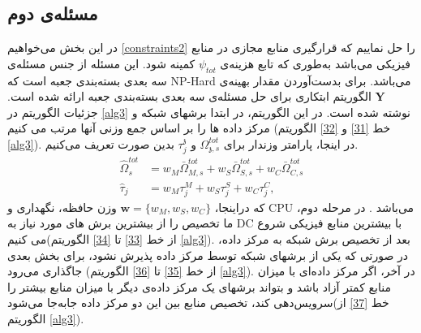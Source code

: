 \subsection{مسئله‌ی دوم}
در این بخش می‌خواهیم \eqref{constraints2} را حل نماییم که قرارگیری منابع مجازی در منابع فیزیکی می‌باشد به‌طوری که تابع هزینه‌ی  $\psi_{tot}$ کمینه شود. این مسئله از جنس مسئله‌ی سه بعدی بسته‌بندی جعبه است که NP-Hard می‌باشد. 
برای بدست‌آوردن مقدار بهینه‌ی $\boldsymbol{Y}$ الگوریتم ابتکاری برای حل مسئله‌ی سه بعدی بسته‌بندی جعبه ارائه شده است.
جزئیات الگوریتم در \eqref{alg3} نوشته شده است. در این الگوریتم، در ابتدا برشهای شبکه و مرکز داده ها را بر اساس  جمع وزنی آنها مرتب می کنیم (خط \ref{31} و \ref{32} الگوریتم \ref{alg3}).
در اینجا، پارامتر وزندار برای $\Omega_{\mathfrak{z},s}^{tot}$ و $\tau_j^\mathfrak{z}$ بدین صورت تعریف می‌کنیم.
\begin{equation}\label{wt}
	\begin{split}
		\hat{\Omega}_{s}^{tot} &= w_M \bar{\Omega}_{M,s}^{tot} + w_S \bar{\Omega}_{S,s}^{tot} + w_C \bar{\Omega}_{C,s}^{tot} \\
		\hat{\tau}_j &= w_M \tau_{{j}}^M + w_S \tau_{{j}}^S + w_C \tau_{{j}}^C,
	\end{split}
\end{equation}
که دراینجا، $\boldsymbol{w} = \{w_M, w_S, w_C\}$ وزن حافظه، نگهداری و CPU می‌باشد
\cite{3dbin}.
در مرحله دوم، ما تخصیص را از بیشترین برش های مورد نیاز به DC با بیشترین منابع فیزیکی شروع می کنیم(از خط \ref{33} تا \ref{34} الگوریتم \ref{alg3}).
 بعد از تخصیص برش شبکه به مرکز داده، در صورتی که یکی از برشهای شبکه توسط مرکز داده پذیرش نشود، برای بخش بعدی جاگذاری می‌رود
 (از خط \ref{35} تا \ref{36} الگوریتم \ref{alg3}).
 در آخر، اگر مرکز داده‌ای با میزان منابع کمتر آزاد باشد و بتواند برشهای یک مرکز داده‌ی دیگر با میزان منابع بیشتر را سرویس‌دهی کند، 
 تخصیص منابع بین این دو مرکز داده جابه‌جا می‌شود(خط \ref{37} از الگوریتم \ref{alg3}). 
